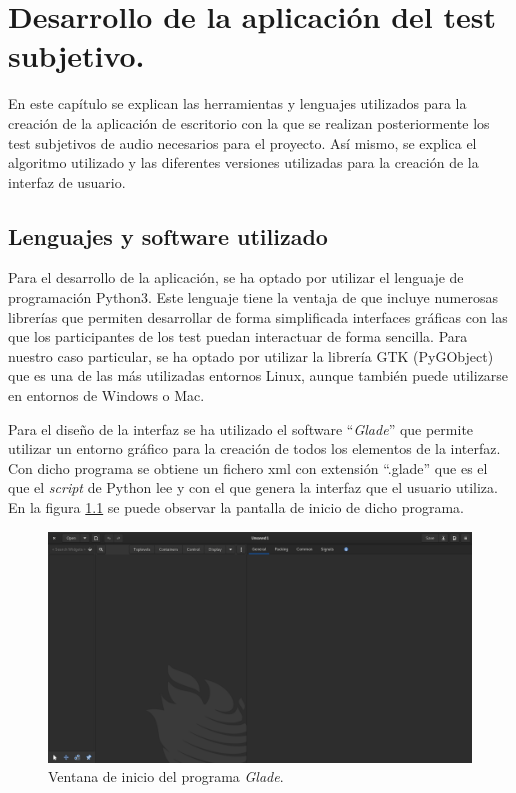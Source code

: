 \documentclass[11pt,a4paper,twoside]{book}
\author{Víctor de Tejada Molera}
\begin{document}
    \chapter{Desarrollo de la aplicación del test subjetivo.}
        En este capítulo se explican las herramientas y lenguajes utilizados para la creación de la aplicación de escritorio con la que se realizan posteriormente los test subjetivos de audio necesarios para el proyecto. Así mismo, se explica el algoritmo utilizado y las diferentes versiones utilizadas para la creación de la interfaz de usuario.
        
        \section{Lenguajes y software utilizado}
            Para el desarrollo de la aplicación, se ha optado por utilizar el lenguaje de programación Python3. Este lenguaje tiene la ventaja de que incluye numerosas librerías que permiten desarrollar de forma simplificada interfaces gráficas con las que los participantes de los test puedan interactuar de forma sencilla. Para nuestro caso particular, se ha optado por utilizar la librería GTK (PyGObject) que es una de las más utilizadas entornos Linux, aunque también puede utilizarse en entornos de Windows o Mac.
            
            Para el diseño de la interfaz se ha utilizado el software ``\textit{Glade}'' que permite utilizar un entorno gráfico para la creación de todos los elementos de la interfaz. Con dicho programa se obtiene un fichero xml con extensión ``.glade'' que es el que el \textit{script} de Python lee y con el que genera la interfaz que el usuario utiliza. En la figura \ref{fig:gladeInic} se puede observar la pantalla de inicio de dicho programa. 
            
            \begin{figure}
                \begin{center}
                    \includegraphics[scale=.2]{../imagenes/gladeInicio.png}
                    \caption{Ventana de inicio del programa \textit{Glade}.}
                    \label{fig:gladeInic}
                \end{center}
            \end{figure}
            
\end{document}
